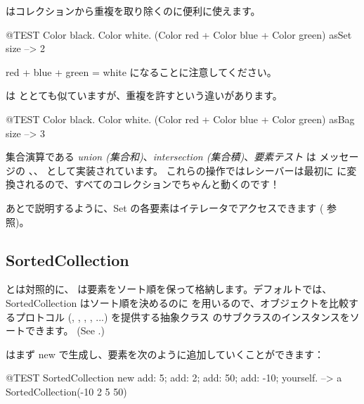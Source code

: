 \documentclass[a4paper,10pt,twoside]{book}
\begin{document}
 はコレクションから重複を取り除くのに便利に使えます。
\begin{code}{@TEST}
{ Color black. Color white. (Color red + Color blue + Color green) } asSet size --> 2
\end{code}
\noindent
red + blue + green = white になることに注意してください。

 は  ととても似ていますが、重複を許すという違いがあります。
\begin{code}{@TEST}
{ Color black. Color white. (Color red + Color blue + Color green) } asBag size --> 3
\end{code}

集合演算である \emph{union (集合和)}、\emph{intersection (集合積)}、\emph{要素テスト} は  メッセージの 、、 として実装されています。
これらの操作ではレシーバーは最初に  に変換されるので、すべてのコレクションでちゃんと動くのです！


あとで説明するように、Set の各要素はイテレータでアクセスできます ( 参照)。

\subsection{SortedCollection}
 とは対照的に、 は要素をソート順を保って格納します。デフォルトでは、SortedCollection はソート順を決めるのに  を用いるので、オブジェクトを比較するプロトコル (, , , , ...) を提供する抽象クラス  のサブクラスのインスタンスをソートできます。
(See .)

 はまず new で生成し、要素を次のように追加していくことができます：
\begin{code}{@TEST}
SortedCollection new add: 5; add: 2; add: 50; add: -10; yourself. --> a SortedCollection(-10 2 5 50)
\end{code}
\end{document}
